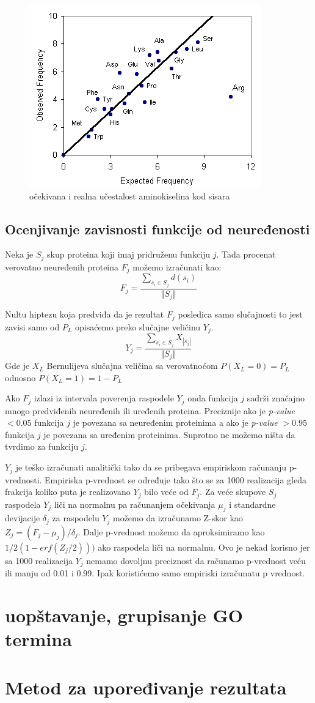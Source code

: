 \begin{figure}[th]
\centering
\includegraphics[scale=0.7]{Figures/aminoacid}
\decoRule
\caption{očekivana i realna učestalost  aminokiselina kod sisara}
\label{fig:aminoacid}
\end{figure}



\subsection{Ocenjivanje zavisnosti funkcije od neuređenosti}

Neka je $S_j$ skup proteina koji imaj pridruženu funkciju $j$. Tada procenat
verovatno neuređenih proteina $F_j$ možemo izračunati kao: $$F_j =
\dfrac{\sum_{s_i \in S_j} d(s_i)} {\Vert S_j \Vert} $$

Nultu hiptezu koja predviđa da je rezultat $F_j$ posledica samo slučajnosti to
jest zavisi samo od $P_L$ opisaćemo preko slučajne veličinu $Y_j$.  $$ Y_j =
\dfrac {\sum_{s_i \in S_j} {X_{|s_j|}}}{\Vert S_j \Vert}$$ Gde je $X_L$
Bernulijeva slučajna veličina sa verovatnoćom $P(X_L = 0) = P_L$ odnosno $P(X_L
= 1) = 1-P_L$

Ako $F_j$ izlazi iz intervala poverenja raspodele $Y_j$ onda funkcija $j$
sadrži značajno mnogo predviđenih neuređenih ili uređenih proteina. Preciznije
ako je \textit{p-value} $<0.05$ funkcija $j$ je povezana sa neuređenim
proteinima a ako je \textit{p-value} $>0.95$ funkcija $j$ je povezana sa
uređenim proteinima. Suprotno ne možemo ništa da tvrdimo za funkciju $j$.

$Y_j$ je teško izračunati analitički tako da se pribegava empiriskom
računanju p-vrednosti. Empiriska p-vrednost se određuje tako što se za 1000
realizacija gleda frakcija koliko puta je realizovano  $Y_j$ bilo veće od
$F_j$.
Za veće skupove $S_j$ raspodela $Y_j$ liči na normalnu pa računanjem očekivanja
$\mu_j$ i standardne devijacije $\delta_j$ za raspodelu $Y_j$ možemo da
izračunamo Z-skor kao $Z_j=(F_j-\mu_j)/\delta_j$. Dalje p-vrednost možemo da
aproksimiramo kao $1/2(1-erf(Z_j/2)))$ ako raspodela liči na normalnu.  Ovo je
nekad korisno jer sa 1000 realizacija $Y_j$ nemamo dovoljnu preciznost da
računamo p-vrednost veću ili manju od 0.01 i 0.99. Ipak koristićemo samo
empiriski izračunatu p vrednost.

\section {uopštavanje, grupisanje  GO termina}

\section {Metod za upoređivanje rezultata}

